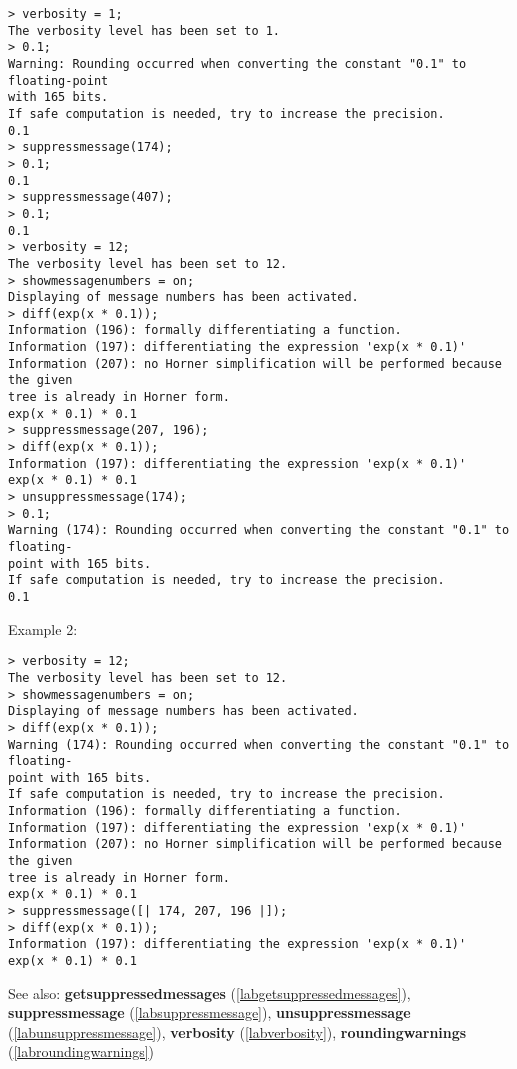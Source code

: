 \begin{center}\begin{minipage}{15cm}\begin{Verbatim}[frame=single,commandchars=\\\|\~]
> verbosity = 1;
The verbosity level has been set to 1.
> 0.1;
Warning: Rounding occurred when converting the constant "0.1" to floating-point 
with 165 bits.
If safe computation is needed, try to increase the precision.
0.1
> suppressmessage(174);
> 0.1;
0.1
> suppressmessage(407);
> 0.1;
0.1
> verbosity = 12;
The verbosity level has been set to 12.
> showmessagenumbers = on;
Displaying of message numbers has been activated.
> diff(exp(x * 0.1));
Information (196): formally differentiating a function.
Information (197): differentiating the expression 'exp(x * 0.1)'
Information (207): no Horner simplification will be performed because the given 
tree is already in Horner form.
exp(x * 0.1) * 0.1
> suppressmessage(207, 196);
> diff(exp(x * 0.1));
Information (197): differentiating the expression 'exp(x * 0.1)'
exp(x * 0.1) * 0.1
> unsuppressmessage(174);
> 0.1;
Warning (174): Rounding occurred when converting the constant "0.1" to floating-
point with 165 bits.
If safe computation is needed, try to increase the precision.
0.1
\end{Verbatim}
\end{minipage}\end{center}
\noindent Example 2: 
\begin{center}\begin{minipage}{15cm}\begin{Verbatim}[frame=single,commandchars=\\\|\~]
> verbosity = 12;
The verbosity level has been set to 12.
> showmessagenumbers = on; 
Displaying of message numbers has been activated.
> diff(exp(x * 0.1));
Warning (174): Rounding occurred when converting the constant "0.1" to floating-
point with 165 bits.
If safe computation is needed, try to increase the precision.
Information (196): formally differentiating a function.
Information (197): differentiating the expression 'exp(x * 0.1)'
Information (207): no Horner simplification will be performed because the given 
tree is already in Horner form.
exp(x * 0.1) * 0.1
> suppressmessage([| 174, 207, 196 |]);
> diff(exp(x * 0.1));
Information (197): differentiating the expression 'exp(x * 0.1)'
exp(x * 0.1) * 0.1
\end{Verbatim}
\end{minipage}\end{center}
See also: \textbf{getsuppressedmessages} (\ref{labgetsuppressedmessages}), \textbf{suppressmessage} (\ref{labsuppressmessage}), \textbf{unsuppressmessage} (\ref{labunsuppressmessage}), \textbf{verbosity} (\ref{labverbosity}), \textbf{roundingwarnings} (\ref{labroundingwarnings})
